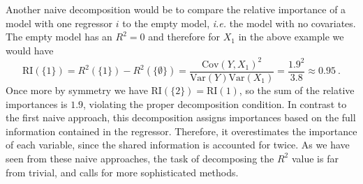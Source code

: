 Another naive decomposition would be to compare the relative importance of a model with one regressor $i$ to the empty model, \textit{i.e.} the model with no covariates. 
The empty model has an $R^2=0$ and therefore for $X_1$ in the above example we would have
\begin{equation}
    \text{RI}(\{1\}) = R^2(\{1\}) - R^2(\{\emptyset\}) = \frac{\text{Cov}(Y, X_1)^2}{\text{Var}(Y)\text{Var}(X_1)} = \frac{1.9^2}{3.8} \approx 0.95 \ .
\end{equation}
Once more by symmetry we have $\text{RI}(\{2\})=\text{RI}(1)$, so the sum of the relative importances is $1.9$, violating the proper decomposition condition.
In contrast to the first naive approach, this decomposition assigns importances based on the full information contained in the regressor. Therefore, it overestimates the importance of each variable, since the shared information is accounted for twice.
\newline
\newline
As we have seen from these naive approaches, the task of decomposing the $R^2$ value is far from trivial, and calls for more sophisticated methods.

